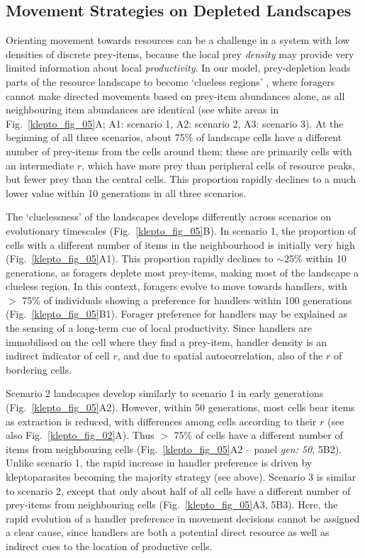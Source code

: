 \subsection*{Movement Strategies on Depleted Landscapes}

Orienting movement towards resources \citep[][\textit{where to move}]{nathan2008a} can be a challenge in a system with low densities of discrete prey-items, because the local prey \textit{density} may provide very limited information about local \textit{productivity}.
In our model, prey-depletion leads parts of the resource landscape to become `clueless regions' \citep{perkins1992}, where foragers cannot make directed movements based on prey-item abundances alone, as all neighbouring item abundances are identical (see white areas in Fig.~\ref{klepto_fig_05}A; A1: scenario 1, A2: scenario 2, A3: scenario 3).
At the beginning of all three scenarios, about 75\% of landscape cells have a different number of prey-items from the cells around them; these are primarily cells with an intermediate $r$, which have more prey than peripheral cells of resource peaks, but fewer prey than the central cells.
This proportion rapidly declines to a much lower value within 10 generations in all three scenarios.

The `cluelessness' of the landscapes develops differently across scenarios on evolutionary timescales (Fig.~\ref{klepto_fig_05}B).
In scenario 1, the proportion of cells with a different number of items in the neighbourhood is initially very high (Fig.~\ref{klepto_fig_05}A1).
This proportion rapidly declines to $\sim$25\% within 10 generations, as foragers deplete most prey-items, making most of the landscape a clueless region.
In this context, foragers evolve to move towards handlers, with $>$ 75\% of individuals showing a preference for handlers within 100 generations (Fig.~\ref{klepto_fig_05}B1).
Forager preference for handlers may be explained as the sensing of a long-term cue of local productivity.
Since handlers are immobilised on the cell where they find a prey-item, handler density is an indirect indicator of cell $r$, and due to spatial autocorrelation, also of the $r$ of bordering cells.

Scenario 2 landscapes develop similarly to scenario 1 in early generations (Fig.~\ref{klepto_fig_05}A2).
However, within 50 generations, most cells bear items as extraction is reduced, with differences among cells according to their $r$ (see also Fig.~\ref{klepto_fig_02}A).
Thus $>$ 75\% of cells have a different number of items from neighbouring cells (Fig.~\ref{klepto_fig_05}A2 -- panel \textit{gen: 50}, 5B2).
Unlike scenario 1, the rapid increase in handler preference is driven by kleptoparasites becoming the majority strategy (see above).
Scenario 3 is similar to scenario 2, except that only about half of all cells have a different number of prey-items from neighbouring cells (Fig.~\ref{klepto_fig_05}A3, 5B3).
Here, the rapid evolution of a handler preference in movement decisions cannot be assigned a clear cause, since handlers are both a potential direct resource as well as indirect cues to the location of productive cells.

